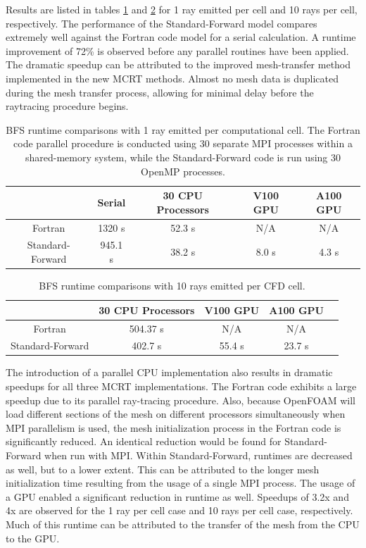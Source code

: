 Results are listed in tables \ref{table:BFS_runtime_table_1rpc} and \ref{table:BFS_runtime_table_10rpc} for 1 ray emitted per cell and 10 rays per cell, respectively. The performance of the Standard-Forward model compares extremely well against the Fortran code model for a serial calculation. A runtime improvement of 72\% is observed before any parallel routines have been applied.
The dramatic speedup can be attributed to the improved mesh-transfer method implemented in the new MCRT methods. 
Almost no mesh data is duplicated during the mesh transfer process, allowing for minimal delay before the raytracing procedure begins.

\begin{table}
\centering
\caption{BFS runtime comparisons with 1 ray emitted per computational cell. The Fortran code parallel procedure is conducted using 30 separate MPI processes within a shared-memory system, while the Standard-Forward code is run using 30 OpenMP processes.}
\begin{tabular}{c c c c c} 
 \hline
  & Serial & 30 CPU Processors & V100 GPU & A100 GPU \\ [0.5ex] 
 \hline
 Fortran & 1320 s &  52.3 s & N/A & N/A \\ 
 Standard-Forward & 945.1 s & 38.2 s & 8.0 s & 4.3 s \\
 \hline
\end{tabular}
\label{table:BFS_runtime_table_1rpc}
\end{table}

\begin{table}
\centering
\caption{BFS runtime comparisons with 10 rays emitted per CFD cell.}
\begin{tabular}{c c c c c} 
 \hline
  & 30 CPU Processors & V100 GPU & A100 GPU \\ [0.5ex] 
 \hline
 Fortran & 504.37 s & N/A & N/A \\%
 Standard-Forward & 402.7 s & 55.4 s & 23.7 s \\%
 \hline
\end{tabular}
\label{table:BFS_runtime_table_10rpc}
\end{table}



The introduction of a parallel CPU implementation also results in dramatic speedups for all three MCRT implementations. The Fortran code exhibits a large speedup due to its parallel ray-tracing procedure. Also, because OpenFOAM will load different sections of the mesh on different processors simultaneously when MPI parallelism is used, the mesh initialization process in the Fortran code is significantly reduced. An identical reduction would be found for Standard-Forward when run with MPI.
Within Standard-Forward, runtimes are decreased as well, but to a lower extent. This can be attributed to the longer mesh initialization time resulting from the usage of a single MPI process.
The usage of a GPU enabled a significant reduction in runtime as well. Speedups of 3.2x and 4x are observed for the 1 ray per cell case and 10 rays per cell case, respectively.
Much of this runtime can be attributed to the transfer of the mesh from the CPU to the GPU.

